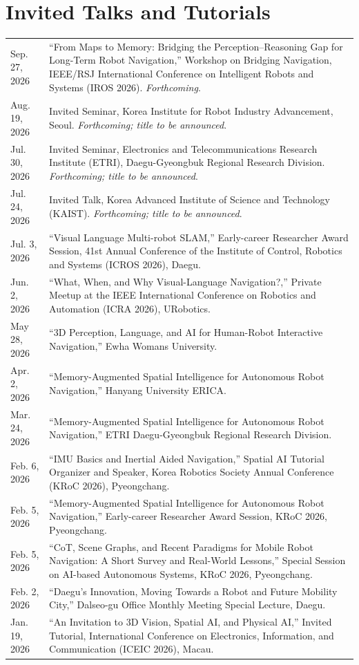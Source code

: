 \documentclass[10pt,a4paper]{article}
\newcommand{\daterow}[2]{#1 & #2 \\[2.2pt]}
\begin{document}
\section{Invited Talks and Tutorials}
\begin{longtable}{@{}L{32mm}L{135mm}@{}}
\daterow{Sep. 27, 2026}{``From Maps to Memory: Bridging the Perception--Reasoning Gap for Long-Term Robot Navigation,'' Workshop on Bridging Navigation, IEEE/RSJ International Conference on Intelligent Robots and Systems (IROS 2026). \textit{Forthcoming}.}
\daterow{Aug. 19, 2026}{Invited Seminar, Korea Institute for Robot Industry Advancement, Seoul. \textit{Forthcoming; title to be announced}.}
\daterow{Jul. 30, 2026}{Invited Seminar, Electronics and Telecommunications Research Institute (ETRI), Daegu-Gyeongbuk Regional Research Division. \textit{Forthcoming; title to be announced}.}
\daterow{Jul. 24, 2026}{Invited Talk, Korea Advanced Institute of Science and Technology (KAIST). \textit{Forthcoming; title to be announced}.}
\daterow{Jul. 3, 2026}{``Visual Language Multi-robot SLAM,'' Early-career Researcher Award Session, 41st Annual Conference of the Institute of Control, Robotics and Systems (ICROS 2026), Daegu.}
\daterow{Jun. 2, 2026}{``What, When, and Why Visual-Language Navigation?,'' Private Meetup at the IEEE International Conference on Robotics and Automation (ICRA 2026), URobotics.}
\daterow{May 28, 2026}{``3D Perception, Language, and AI for Human-Robot Interactive Navigation,'' Ewha Womans University.}
\daterow{Apr. 2, 2026}{``Memory-Augmented Spatial Intelligence for Autonomous Robot Navigation,'' Hanyang University ERICA.}
\daterow{Mar. 24, 2026}{``Memory-Augmented Spatial Intelligence for Autonomous Robot Navigation,'' ETRI Daegu-Gyeongbuk Regional Research Division.}
\daterow{Feb. 6, 2026}{``IMU Basics and Inertial Aided Navigation,'' Spatial AI Tutorial Organizer and Speaker, Korea Robotics Society Annual Conference (KRoC 2026), Pyeongchang.}
\daterow{Feb. 5, 2026}{``Memory-Augmented Spatial Intelligence for Autonomous Robot Navigation,'' Early-career Researcher Award Session, KRoC 2026, Pyeongchang.}
\daterow{Feb. 5, 2026}{``CoT, Scene Graphs, and Recent Paradigms for Mobile Robot Navigation: A Short Survey and Real-World Lessons,'' Special Session on AI-based Autonomous Systems, KRoC 2026, Pyeongchang.}
\daterow{Feb. 2, 2026}{``Daegu's Innovation, Moving Towards a Robot and Future Mobility City,'' Dalseo-gu Office Monthly Meeting Special Lecture, Daegu.}
\daterow{Jan. 19, 2026}{``An Invitation to 3D Vision, Spatial AI, and Physical AI,'' Invited Tutorial, International Conference on Electronics, Information, and Communication (ICEIC 2026), Macau.}

\end{longtable}
\end{document}
